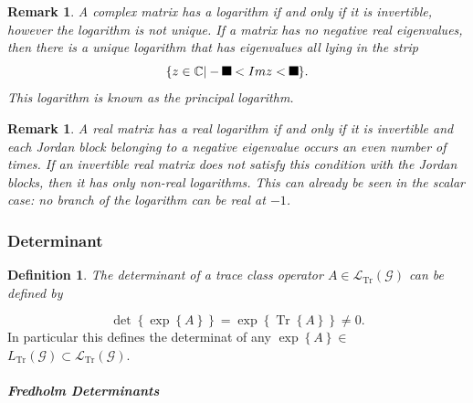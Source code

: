 \documentclass[aps,preprint]{revtex4}%
\providecommand{\U}[1]{\protect\rule{.1in}{.1in}}
\newtheorem{definition}[theorem]{Definition}
\newtheorem{remark}[theorem]{Remark}
\begin{document}
\begin{remark}
\emph{A complex matrix has a logarithm if and only if it is invertible,
however the logarithm is not unique}. If a matrix \emph{has no negative real}
eigenvalues, then there is a \emph{unique logarithm} that has eigenvalues all
lying in the strip
\begin{equation}
\{z\in\mathbb{C}|-\U{3c0} <Imz<\U{3c0} \}.
\end{equation}
This logarithm is known as the \emph{principal logarithm. }
\end{remark}

\begin{remark}
A real matrix has a real logarithm if and only if it is invertible and each
Jordan block belonging to a negative eigenvalue occurs an even number of
times. If an invertible real matrix does not satisfy this condition with the
Jordan blocks, then it has only non-real logarithms. This can already be seen
in the scalar case: no branch of the logarithm can be real at $-1$.
\end{remark}

\subsubsection{Determinant}

\begin{definition}
The \emph{determinant of a trace class} operator $A\in\mathcal{L}%
_{\operatorname{Tr}}\left(  \mathcal{G}\right)  $ can be defined by
\end{definition}

%

\begin{equation}
\det\left\{  \exp\left\{  A\right\}  \right\}  =\exp\left\{  \operatorname{Tr}%
\left\{  A\right\}  \right\}  \neq0.
\end{equation}
In particular this defines the determinat of any $\exp\left\{  A\right\}  \in$
$L_{\operatorname{Tr}}\left(  \mathcal{G}\right)  \subset\mathcal{L}%
_{\operatorname{Tr}}\left(  \mathcal{G}\right)  .$

\subparagraph{Fredholm Determinants}
\end{document}

